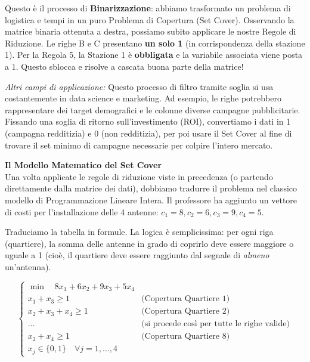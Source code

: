 \documentclass[12pt, a4paper]{article}
\newcommand{\separatore}{\noindent{\color{titlecolor!50}\rule{\textwidth}{0.6pt}}}
\begin{document}
	Questo è il processo di \textbf{Binarizzazione}: abbiamo trasformato un problema di logistica e tempi in un puro Problema di Copertura (Set Cover). Osservando la matrice binaria ottenuta a destra, possiamo subito applicare le nostre Regole di Riduzione. 
	Le righe B e C presentano \textbf{un solo 1} (in corrispondenza della stazione 1). Per la Regola 5, la Stazione 1 è \textbf{obbligata} e la variabile associata viene posta a $1$. Questo sblocca e risolve a cascata buona parte della matrice!
	
	\textit{Altri campi di applicazione:} Questo processo di filtro tramite soglia si usa costantemente in data science e marketing. Ad esempio, le righe potrebbero rappresentare dei target demografici e le colonne diverse campagne pubblicitarie. Fissando una soglia di ritorno sull'investimento (ROI), convertiamo i dati in 1 (campagna redditizia) e 0 (non redditizia), per poi usare il Set Cover al fine di trovare il set minimo di campagne necessarie per colpire l'intero mercato.
	
	\vspace{0.6cm}
	\separatore
	\vspace{0.4cm}
	
	\textbf{Il Modello Matematico del Set Cover}\\
	Una volta applicate le regole di riduzione viste in precedenza (o partendo direttamente dalla matrice dei dati), dobbiamo tradurre il problema nel classico modello di Programmazione Lineare Intera. Il professore ha aggiunto un vettore di costi per l'installazione delle 4 antenne: $c_1=8, c_2=6, c_3=9, c_4=5$.
	
	Traduciamo la tabella in formule. La logica è semplicissima: per ogni riga (quartiere), la somma delle antenne in grado di coprirlo deve essere maggiore o uguale a 1 (cioè, il quartiere deve essere raggiunto dal segnale di \textit{almeno} un'antenna).
	
	\[
	\begin{cases} 
		\min \quad 8x_1 + 6x_2 + 9x_3 + 5x_4 \\[6pt]
		x_1 + x_3 \geq 1 \quad &\text{(Copertura Quartiere 1)} \\ 
		x_2 + x_3 + x_4 \geq 1 \quad &\text{(Copertura Quartiere 2)} \\ 
		\dots \quad &\text{(si procede così per tutte le righe valide)} \\ 
		x_2 + x_4 \geq 1 \quad &\text{(Copertura Quartiere 8)} \\[6pt]
		x_j \in \{0, 1\} \quad \forall j = 1, \dots, 4 
	\end{cases}
	\]
	
\end{document}
